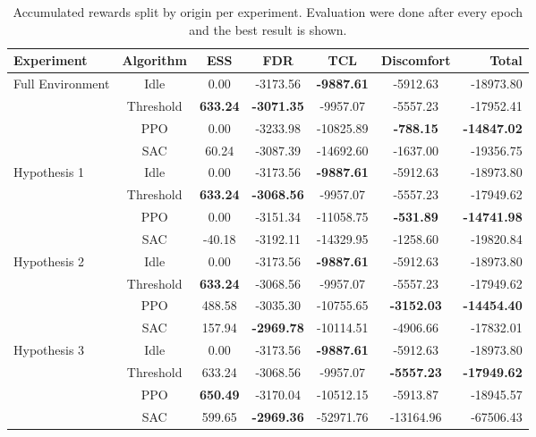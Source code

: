 \begin{table}[t]
\caption{Accumulated rewards split by origin per experiment. Evaluation were done after every epoch and the best result is shown.}
\label{tab:experiments}
\vskip 0.15in
\begin{center}
\begin{small}
\begin{sc}
\begin{tabular}{lcccccr}
\toprule
Experiment & Algorithm & ESS & FDR & TCL & Discomfort & Total \\
\midrule
\multirow{4}{*}{Full Environment} 
    & Idle      & 0.00   & -3173.56 & \textbf{-9887.61}  & -5912.63 & -18973.80 \\
    & Threshold & \textbf{633.24} & \textbf{-3071.35} & -9957.07  & -5557.23 & -17952.41 \\
    & PPO       & 0.00   & -3233.98 & -10825.89 & \textbf{-788.15} & \textbf{-14847.02} \\
    & SAC       & 60.24  & -3087.39 & -14692.60 & -1637.00 & -19356.75 \\
\midrule
\multirow{4}{*}{Hypothesis 1}
    & Idle      & 0.00   & -3173.56 & \textbf{-9887.61} & -5912.63 & -18973.80 \\
    & Threshold & \textbf{633.24} & \textbf{-3068.56} & -9957.07 & -5557.23 & -17949.62 \\
    & PPO       & 0.00   & -3151.34 & -11058.75& \textbf{-531.89} & \textbf{-14741.98} \\
    & SAC       & -40.18 & -3192.11 & -14329.95 & -1258.60 & -19820.84 \\
\midrule
\multirow{4}{*}{Hypothesis 2} 
    & Idle      & 0.00   & -3173.56 & \textbf{-9887.61} & -5912.63 & -18973.80 \\
    & Threshold & \textbf{633.24} & -3068.56 & -9957.07 & -5557.23 & -17949.62 \\
    & PPO       & 488.58 & -3035.30 & -10755.65 & \textbf{-3152.03} & \textbf{-14454.40} \\
    & SAC       & 157.94 & \textbf{-2969.78} & -10114.51 & -4906.66 & -17832.01 \\
\midrule
\multirow{4}{*}{Hypothesis 3} 
    & Idle      & 0.00   & -3173.56 & \textbf{-9887.61} & -5912.63 & -18973.80 \\
    & Threshold & 633.24 & -3068.56 & -9957.07 & \textbf{-5557.23} & \textbf{-17949.62} \\
    & PPO       & \textbf{650.49} & -3170.04 & -10512.15 & -5913.87 & -18945.57 \\
    & SAC       & 599.65 & \textbf{-2969.36} & -52971.76 & -13164.96 & -67506.43 \\
\bottomrule
\end{tabular}
\end{sc}
\end{small}
\end{center}
\vskip -0.1in
\end{table}


